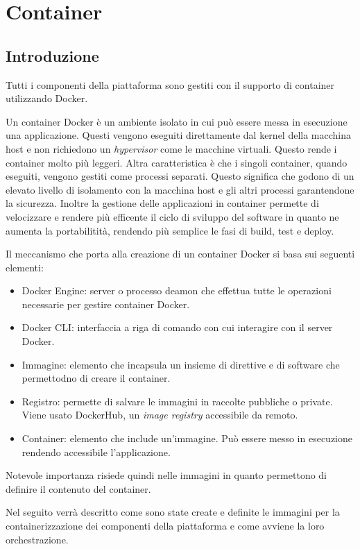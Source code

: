 \section{Container}
\subsection{Introduzione}
Tutti i componenti della piattaforma sono gestiti con il supporto di container utilizzando Docker.

Un container Docker è un ambiente isolato in cui può essere messa in esecuzione una applicazione.
Questi vengono eseguiti direttamente dal kernel della macchina host e non richiedono un \textit{hypervisor} come le
macchine virtuali. Questo rende i container molto più leggeri. Altra caratteristica è che i singoli container,
quando eseguiti, vengono gestiti come processi separati. Questo significa che godono di un elevato livello di isolamento
con la macchina host e gli altri processi garantendone la sicurezza.
Inoltre la gestione delle applicazioni in container permette di velocizzare e rendere più efficente il ciclo di sviluppo del software in quanto
ne aumenta la portabilitità, rendendo più semplice le fasi di build, test e deploy.

Il meccanismo che porta alla creazione di un container Docker si basa sui seguenti elementi:
\begin{itemize}
    \itemsep0em
    \item Docker Engine: server o processo deamon che effettua tutte le operazioni necessarie per gestire container Docker.
    \item Docker CLI: interfaccia a riga di comando con cui interagire con il server Docker.
    \item Immagine: elemento che incapsula un insieme di direttive e di software che permettodno di creare il container.
    \item Registro: permette di salvare le immagini in raccolte pubbliche o private. Viene usato DockerHub, un \textit{image registry} accessibile da remoto.
    \item Container: elemento che include un'immagine. Può essere messo in esecuzione rendendo accessibile l'applicazione.
\end{itemize}

Notevole importanza risiede quindi nelle immagini in quanto permettono di definire il contenuto del container.

Nel seguito verrà descritto come sono state create e definite le immagini per la containerizzazione dei componenti della piattaforma
e come avviene la loro orchestrazione.


